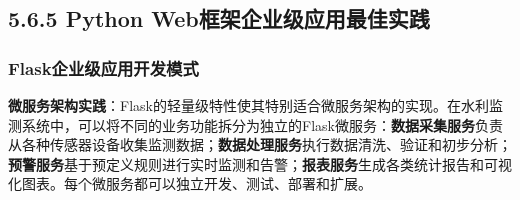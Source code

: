 \begin{Shaded}
\begin{Highlighting}[]

\OperatorTok{=}
    \NormalTok{ \_ } \NormalTok{(}\NormalTok{):}
\OperatorTok{=}\NormalTok{)}
\OperatorTok{=}
    \OperatorTok{{-}}

\OperatorTok{=}
    \NormalTok{ \_ } \NormalTok{(}\NormalTok{):}
\OperatorTok{=}\NormalTok{)}
\OperatorTok{=}
    \OperatorTok{{-}}
\end{Highlighting}
\end{Shaded}

\subsection{5.6.5 Python Web框架企业级应用最佳实践}\label{python-webux6846ux67b6ux4f01ux4e1aux7ea7ux5e94ux7528ux6700ux4f73ux5b9eux8df5}

\subsubsection{Flask企业级应用开发模式}\label{flaskux4f01ux4e1aux7ea7ux5e94ux7528ux5f00ux53d1ux6a21ux5f0f}

\textbf{微服务架构实践}：Flask的轻量级特性使其特别适合微服务架构的实现。在水利监测系统中，可以将不同的业务功能拆分为独立的Flask微服务：\textbf{数据采集服务}负责从各种传感器设备收集监测数据；\textbf{数据处理服务}执行数据清洗、验证和初步分析；\textbf{预警服务}基于预定义规则进行实时监测和告警；\textbf{报表服务}生成各类统计报告和可视化图表。每个微服务都可以独立开发、测试、部署和扩展。

